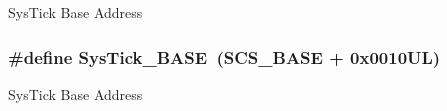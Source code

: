 Sys\-Tick Base Address \hypertarget{group___c_m_s_i_s__core__register_ga58effaac0b93006b756d33209e814646}{
\subsubsection[{Sys\-Tick\-\_\-\-B\-A\-S\-E}]{\setlength{\rightskip}{0pt plus 5cm}\#define Sys\-Tick\-\_\-\-B\-A\-S\-E~({\bf S\-C\-S\-\_\-\-B\-A\-S\-E} +  0x0010\-U\-L)}}\label{group___c_m_s_i_s__core__register_ga58effaac0b93006b756d33209e814646}
Sys\-Tick Base Address 